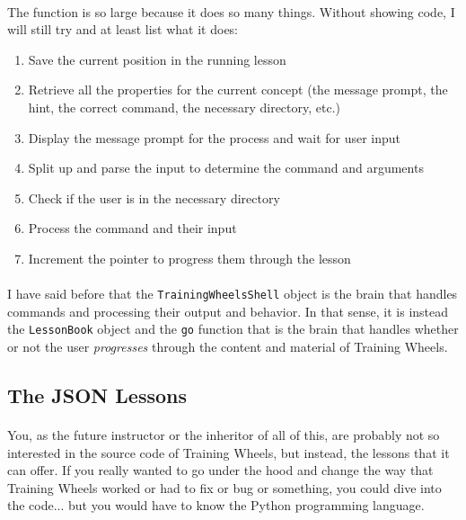 \documentclass[11pt]{article}
\begin{document}
	\paragraph{} The function is so large because it does so many things. Without showing code, I will still try and at least list what it does:

	\begin{enumerate}
		\item Save the current position in the running lesson
		\item Retrieve all the properties for the current concept (the message prompt, the hint, the correct command, the necessary directory, etc.)
		\item Display the message prompt for the process and wait for user input
		\item Split up and parse the input to determine the command and arguments
		\item Check if the user is in the necessary directory
		\item Process the command and their input
		\item Increment the pointer to progress them through the lesson
	\end{enumerate} 

	\paragraph{} I have said before that the \texttt{TrainingWheelsShell} object is the brain that handles commands and processing their output and behavior. In that sense, it is instead the \texttt{LessonBook} object and the \texttt{go} function that is the brain that handles whether or not the user \textit{progresses} through the content and material of Training Wheels. 

	\newpage

	\subsection{The JSON Lessons}

	\paragraph{} You, as the future instructor or the inheritor of all of this, are probably not so interested in the source code of Training Wheels, but instead, the lessons that it can offer. If you really wanted to go under the hood and change the way that Training Wheels worked or had to fix or bug or something, you could dive into the code... but you would have to know the Python programming language.
\end{document}
